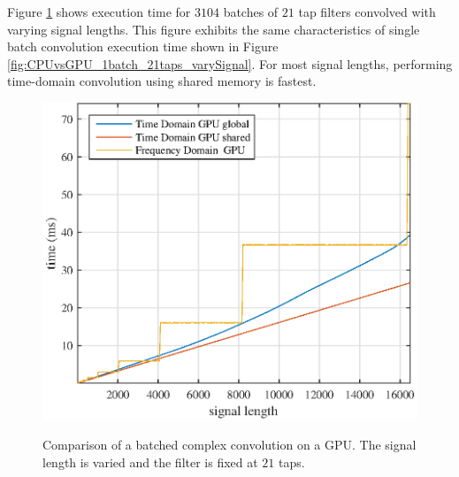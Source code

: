 Figure \ref{fig:CPUvsGPU_3104batch_21taps_varySignal} shows execution time for $3104$ batches of $21$ tap filters convolved with varying signal lengths.
This figure exhibits the same characteristics of single batch convolution execution time shown in Figure \ref{fig:CPUvsGPU_1batch_21taps_varySignal}.
For most signal lengths, performing time-domain convolution using shared memory is fastest.
\begin{figure}
	\centering\includegraphics[width=5in]{figures/gpu_intro/CPUvsGPU_3104batch_21taps_varySignal.eps}
	\label{fig:CPUvsGPU_3104batch_21taps_varySignal}
	\caption{Comparison of a batched complex convolution on a GPU. The signal length is varied and the filter is fixed at $21$ taps.}
\end{figure}

